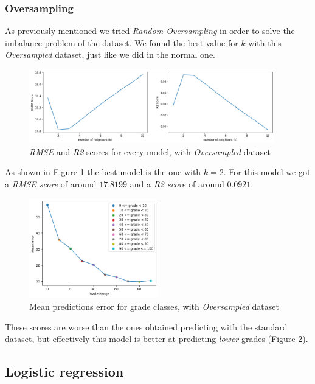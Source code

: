 \documentclass{article}
\begin{document}
\subsubsection{Oversampling}
As previously mentioned we tried \textit{Random Oversampling} in order to solve the imbalance problem of the dataset.
We found the best value for $k$ with this \textit{Oversampled} dataset, just like we did in the normal one.
\begin{figure}[ht]
\centering
\includegraphics[width=0.95\textwidth]{KNN_scores_over.png}
\caption{\textit{RMSE} and \textit{R2} scores for every model, with \textit{Oversampled} dataset}
\label{fig:knn-scores-over}
\end{figure}
As shown in Figure \ref{fig:knn-scores-over} the best model is the one with $k = 2$.
For this model we got a \textit{RMSE score} of around $17.8199$ and a \textit{R2 score} of around $0.0921$.
\begin{figure}[ht]
\centering
\includegraphics[width=0.5\textwidth]{KNN_errs_class_over.png}
\caption{Mean predictions error for grade classes, with \textit{Oversampled} dataset}
\label{fig:knn-err-over}
\end{figure}
These scores are worse than the ones obtained predicting with the standard dataset, but effectively this model is better at predicting \textit{lower} grades (Figure \ref{fig:knn-err-over}).

\FloatBarrier
\subsection{Logistic regression}
\end{document}
